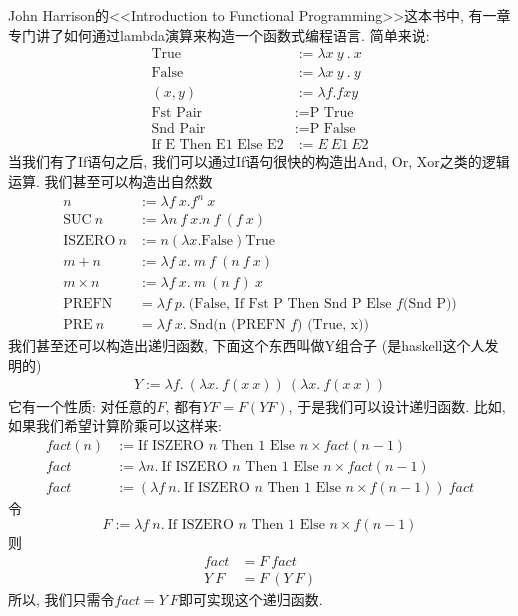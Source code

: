 \documentclass{article}
\begin{document}
John Harrison的<<Introduction to Functional Programming>>这本书中, 有一章专门讲了如何通过lambda演算来构造一个函数式编程语言.
简单来说:
\begin{align*}
  \mbox{True} &:= \lambda x\ y\ .\ x \\
  \mbox{False} &:= \lambda x\ y\ .\ y \\
  (x, y) &:= \lambda f . f x y \\
  \mbox{Fst Pair} &:= \mbox{P True} \\
  \mbox{Snd Pair} &:= \mbox{P False} \\
  \mbox{If E Then E1 Else E2} &:= E\ E1\ E2 
\end{align*}
当我们有了If语句之后, 我们可以通过If语句很快的构造出And, Or, Xor之类的逻辑运算.
我们甚至可以构造出自然数
\begin{align*}
  n &:= \lambda f\ x. f^n\ x \\
  \mbox{SUC}\ n &:= \lambda n\ f\ x. n\ f\ (f\ x) \\
  \mbox{ISZERO}\ n &:= n (\lambda x. \mbox{False}) \mbox{True} \\
  m + n &:= \lambda f\ x.\ m\ f\ (n\ f\ x) \\
  m \times n &:= \lambda f\ x.\ m\ (n\ f)\ x\\
  \mbox{PREFN} &= \lambda f\ p.\ \mbox{(False, If Fst P Then Snd P Else $f$(Snd P))} \\ 
  \mbox{PRE}\ n &= \lambda f\ x.\ \mbox{Snd(n (PREFN $f$) (True, x))}
\end{align*}
我们甚至还可以构造出递归函数, 下面这个东西叫做Y组合子 (是haskell这个人发明的)
\begin{align*}
  Y := \lambda f.\ (\lambda x.\ f(x\ x))\ (\lambda x.\ f(x\ x))
\end{align*}
它有一个性质: 对任意的$F$, 都有$Y F = F(Y F)$, 于是我们可以设计递归函数.
比如, 如果我们希望计算阶乘可以这样来:
\begin{align*}
  fact(n) &:= \mbox{If ISZERO $n$ Then 1 Else $n\times fact(n-1)$} \\
  fact    &:= \lambda n.\ \mbox{If ISZERO $n$ Then 1 Else $n\times fact(n-1)$} \\
  fact    &:= (\lambda f\ n.\ \mbox{If ISZERO $n$ Then 1 Else $n\times f(n-1)$})\ fact
\end{align*}
令
\[
   F := \lambda f\ n.\ \mbox{If ISZERO $n$ Then 1 Else $n\times f(n-1)$}
\]
则 
\begin{align*}
  fact &= F\ fact \\
  Y\ F &= F\ (Y\ F)
\end{align*}
所以, 我们只需令$fact = Y\ F$即可实现这个递归函数.
\end{document}
